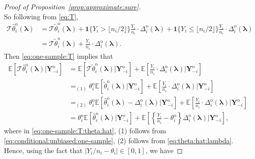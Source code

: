 \documentclass[12pt,letterpaper]{article}
\begin{document}
\begin{proof}[Proof of Proposition~\ref{prop:approximate:sure}]
\begin{equation}
\end{equation}
So following from \eqref{eq:T}, 
\begin{equation}\label{eq:one-sample:T}
\begin{array}{rl}
    \mathcal{T}\hat{\theta}_i^{\mathrm{o}}(\boldsymbol{\lambda})&\displaystyle=\mathcal{T}\tilde{\theta}_i^{\mathrm{o}}(\boldsymbol{\lambda})+\mathbf{1}\{Y_i>\lfloor n_i/2\rfloor\}\frac{Y_i}{n_i}\cdot\Delta_i^{\mathrm{o}}(\boldsymbol{\lambda})+\mathbf{1}\{Y_i\leq\lfloor n_i/2\rfloor\}\frac{Y_i}{n_i}\cdot\Delta_i^{\mathrm{o}}(\boldsymbol{\lambda})\\
    &\displaystyle=\mathcal{T}\tilde{\theta}_i^{\mathrm{o}}(\boldsymbol{\lambda})+\frac{Y_i}{n_i}\cdot\Delta_i^{\mathrm{o}}(\boldsymbol{\lambda}).
\end{array}
\end{equation}
Then \eqref{eq:one-sample:T} implies that
\begin{equation}\label{eq:one-sample:T:theta:hat}
\begin{array}{rl}
\mathbb{E}\left[\mathcal{T}\hat{\theta}_i^{\mathrm{o}}(\boldsymbol{\lambda})\big|\mathbf{Y}_{-i}^{\mathrm{o}}\right]\!\!\!\!&\displaystyle=\mathbb{E}\left[\mathcal{T}\tilde{\theta}_i^{\mathrm{o}}(\boldsymbol{\lambda})\big|\mathbf{Y}_{-i}^{\mathrm{o}}\right]+\mathbb{E}\left[\frac{Y_i}{n_i}\cdot\Delta_i^{\mathrm{o}}(\boldsymbol{\lambda})\big|\mathbf{Y}_{-i}^{\mathrm{o}}\right]\\
&\displaystyle=_{(1)}\theta_i^{\mathrm{o}}\mathbb{E}\left[\tilde{\theta}_i^{\mathrm{o}}(\boldsymbol{\lambda})|\mathbf{Y}_{-i}^{\mathrm{o}}\right]+\mathbb{E}\left[\frac{Y_i}{n_i}\cdot\Delta_i^{\mathrm{o}}(\boldsymbol{\lambda})\big|\mathbf{Y}_{-i}^{\mathrm{o}}\right]\\
&\displaystyle=_{(2)}\theta_i^{\mathrm{o}}\mathbb{E}\left[\hat{\theta}_i^{\mathrm{o}}(\boldsymbol{\lambda})-\Delta_i^{\mathrm{o}}(\boldsymbol{\lambda})\big|\mathbf{Y}_{-i}^{\mathrm{o}}\right]+\mathbb{E}\left[\frac{Y_i}{n_i}\cdot\Delta_i^{\mathrm{o}}(\boldsymbol{\lambda})\big|\mathbf{Y}_{-i}^{\mathrm{o}}\right]\\
&\displaystyle=\theta_i^{\mathrm{o}}\mathbb{E}\left[\hat{\theta}_i^{\mathrm{o}}(\boldsymbol{\lambda})\big|\mathbf{Y}_{-i}^{\mathrm{o}}\right]+\mathbb{E}\left[\left\{\frac{Y_i}{n_i}-\theta_i^{\mathrm{o}}\right\}\Delta_i^{\mathrm{o}}(\boldsymbol{\lambda})\big|\mathbf{Y}_{-i}^{\mathrm{o}}\right],
\end{array}
\end{equation}
where in \eqref{eq:one-sample:T:theta:hat}, (1) follows from \eqref{eq:conditional:unbiased:one-sample}, (2) follows from \eqref{eq:theta:hat:lambda}. Hence, using the fact that $|Y_i/n_i-\theta_i|\in[0,1]$, we have 

\end{proof}
\end{document}
